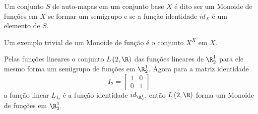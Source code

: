          \begin{definition}
            Um conjunto $S$ de auto-mapas em um conjunto base $X$ é dito ser um Monoide de funções em $X$ se formar um semigrupo e se a função identidade $id_{X}$ é um elemento de $S$.
         \end{definition}
         Um exemplo trivial de um Monoide de função é o conjunto $X^X$ em $X$.
         \begin{exmp}
            Pelas funções lineares o conjunto $L\left(2,\R\right)$ das funções lineares de $\R_{2}^{1}$ para ele mesmo forma um semigrupo de funções em $\R_{2}^{1}$. Agora para a matriz identidade
            $$I_{2} = \begin{bmatrix}
               1 & 0\\
               0 & 1
            \end{bmatrix}
            $$
            a função linear $L_{I_{2}}$ é a função identidade $id_{\R_{2}^{1}}$, então $L\left(2,\R\right)$ forma um Monoide de funções em $\R_{2}^{1}.$
         \end{exmp}

